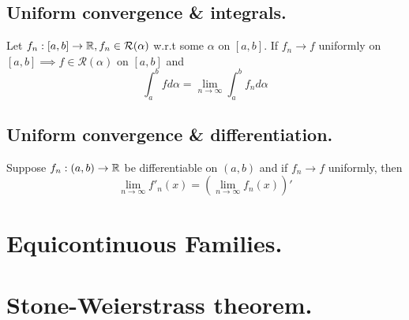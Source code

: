 \subsection{Uniform convergence \& integrals.}
Let $f_n:[a,b]\to\mathbb{R},f_n\in\mathcal{R}(\alpha)$ w.r.t some $\alpha$ on $[a,b]$.
If $f_n\to f$ uniformly on $[a,b]\implies f\in \mathcal{R}(\alpha)$ on $[a,b]$ and 
\begin{equation*}
\int^b_a fd\alpha = \lim_{n\to \infty} \int^b_a f_n d\alpha
\end{equation*}

\subsection{Uniform convergence \& differentiation.}
Suppose $f_n:(a,b)\to\mathbb{R}$ be differentiable on $(a,b)$ and if $f_n\to f$ uniformly, then 
\begin{equation*}
\lim_{n\to\infty} f'_n(x) = \left(\lim_{n\to\infty}f_n(x)\right)'
\end{equation*}

\section{Equicontinuous Families.}

\section{Stone-Weierstrass theorem.}